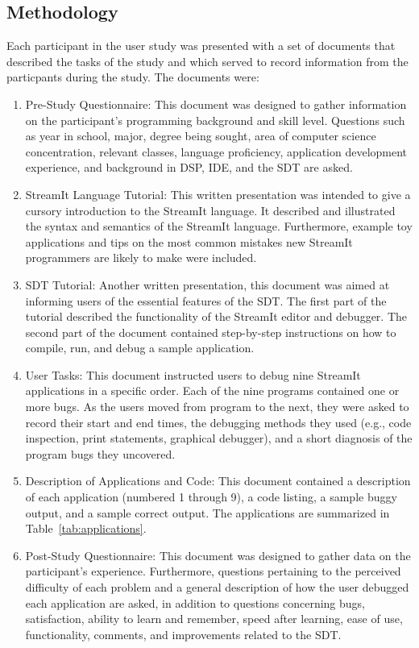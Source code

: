 \documentclass[11pt, letterpaper, onecolumn]{article}
\begin{document}
\subsection{Methodology}

Each participant in the user study was presented with a  set of
documents that described the tasks of the study and which served to
record information from the particpants during the study. The
documents were:
\begin{enumerate}
\item Pre-Study  Questionnaire: This  document was designed  to gather
information  on  the participant's  programming  background and  skill
level. Questions such  as year in school, major,  degree being sought,
area  of computer  science concentration,  relevant  classes, language
proficiency,  application development  experience,  and background  in
DSP, IDE, and the SDT are asked.
\item  StreamIt  Language  Tutorial:  This  written  presentation  was
intended to give  a cursory introduction to the  StreamIt language. It
described  and illustrated the  syntax and  semantics of  the StreamIt
language. Furthermore,  example toy applications and tips  on the most
common  mistakes new  StreamIt  programmers are  likely  to make  were
included.
\item SDT  Tutorial: Another  written presentation, this  document was
aimed at  informing users  of the essential  features of the  SDT. The
first part of the tutorial described the functionality of the StreamIt
editor  and  debugger.  The  second  part of  the  document  contained
step-by-step instructions on  how to compile, run, and  debug a sample
application.
\item  User  Tasks:  This  document  instructed users  to  debug  nine
StreamIt applications in  a specific order. Each of  the nine programs
contained one  or more bugs.  As  the users moved from  program to the
next,  they  were asked  to  record their  start  and  end times,  the
debugging methods they used  (e.g., code inspection, print statements,
graphical debugger),  and a short  diagnosis of the program  bugs they
uncovered.
\item Description of Applications  and Code: This document contained a
description  of  each  application  (numbered  1 through  9),  a  code
listing, a sample buggy output, and a sample correct output. The
applications are summarized in Table~\ref{tab:applications}.
\item Post-Study  Questionnaire: This document was  designed to gather
data   on  the   participant's   experience.  Furthermore,   questions
pertaining to the  perceived difficulty of each problem  and a general
description of  how the user  debugged each application are  asked, in
addition to questions concerning  bugs, satisfaction, ability to learn
and  remember,  speed  after  learning, ease  of  use,  functionality,
comments, and improvements related to the SDT.
\end{enumerate}
\end{document}
